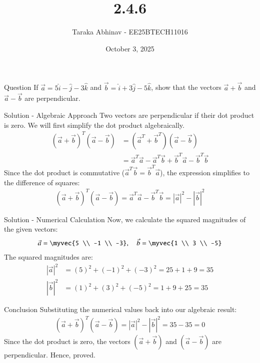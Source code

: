 \documentclass{beamer}
\begin{document}
\title{2.4.6}
\date{October 3, 2025}
\author{Taraka Abhinav - EE25BTECH11016}

\frame{\titlepage}


\begin{frame}{Question}
If $\vec{a} = 5\hat{i} - \hat{j} - 3\hat{k}$ and $\vec{b} = \hat{i} + 3\hat{j} - 5\hat{k}$, show that the vectors $\vec{a} + \vec{b}$ and $\vec{a} - \vec{b}$ are perpendicular.
\end{frame}

\begin{frame}{Solution - Algebraic Approach}
Two vectors are perpendicular if their dot product is zero. We will first simplify the dot product algebraically.
\begin{align}
    (\vec{a} + \vec{b})^T (\vec{a} - \vec{b}) &= (\vec{a}^T + \vec{b}^T)(\vec{a} - \vec{b}) \nonumber \\
    &= \vec{a}^T\vec{a} - \vec{a}^T\vec{b} + \vec{b}^T\vec{a} - \vec{b}^T\vec{b}
\end{align}
Since the dot product is commutative ($\vec{a}^T\vec{b} = \vec{b}^T\vec{a}$), the expression simplifies to the difference of squares:
\begin{align}
    (\vec{a} + \vec{b})^T (\vec{a} - \vec{b}) = \vec{a}^T\vec{a} - \vec{b}^T\vec{b} = |\vec{a}|^2 - |\vec{b}|^2
\end{align}
\end{frame}

\begin{frame}{Solution - Numerical Calculation}
Now, we calculate the squared magnitudes of the given vectors:
\begin{align}
\vec{a} = \myvec{5 \\ -1 \\ -3}, \quad \vec{b} = \myvec{1 \\ 3 \\ -5}
\end{align}
The squared magnitudes are:
\begin{align}
    |\vec{a}|^2 &= (5)^2 + (-1)^2 + (-3)^2 = 25 + 1 + 9 = 35 \\
    |\vec{b}|^2 &= (1)^2 + (3)^2 + (-5)^2 = 1 + 9 + 25 = 35
\end{align}
\end{frame}

\begin{frame}{Conclusion}
Substituting the numerical values back into our algebraic result:
\begin{align}
    (\vec{a} + \vec{b})^T (\vec{a} - \vec{b}) = |\vec{a}|^2 - |\vec{b}|^2 = 35 - 35 = 0
\end{align}
Since the dot product is zero, the vectors $(\vec{a} + \vec{b})$ and $(\vec{a} - \vec{b})$ are perpendicular. Hence, proved.
\end{frame}
\end{document}
